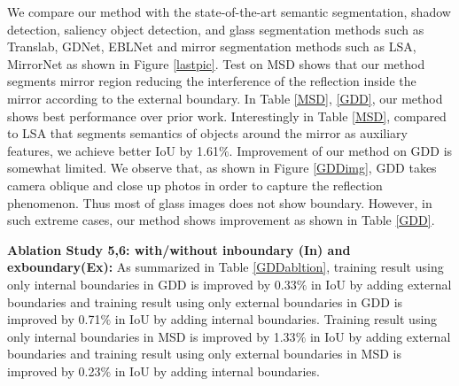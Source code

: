 \documentclass[10pt,twocolumn,letterpaper]{article}
\begin{document}
We compare our method with the state-of-the-art semantic segmentation, shadow detection, saliency object detection, and glass segmentation methods such as Translab, GDNet, EBLNet and mirror segmentation methods such as LSA\cite{guan2022learning}, MirrorNet as shown in Figure \ref{lastpic}. Test on MSD shows that our method segments mirror region reducing the interference of the reflection inside the mirror according to the external boundary.
In Table \ref{MSD}, \ref{GDD}, our method shows best performance over prior work.
Interestingly in Table \ref{MSD}, compared to LSA that segments semantics of objects around the mirror as auxiliary features, we achieve better IoU by 1.61$\%$. 
Improvement of our method on GDD is somewhat limited. We observe that, as shown in Figure \ref{GDDimg}, GDD takes camera oblique and close up photos in order to capture the reflection phenomenon. Thus most of glass images does not show boundary. However, in such extreme cases, our method shows improvement as shown in Table \ref{GDD}. 


\textbf{Ablation Study 5,6: with/without inboundary (In) and
exboundary(Ex):} %
As summarized in Table \ref{GDDabltion}, training result using only internal boundaries in GDD is improved by 0.33$\%$ in IoU by adding external boundaries and training result using only external boundaries in GDD is improved by 0.71$\%$ in IoU by adding internal boundaries. Training result using only internal boundaries in MSD is improved by 1.33$\%$ in IoU by adding external boundaries and training result using only external boundaries in MSD is improved by 0.23$\%$ in IoU by adding internal boundaries.%
\end{document}

